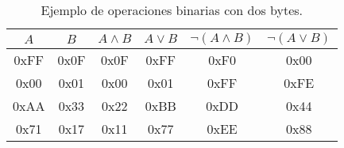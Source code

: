 \begin{table}
    \caption{Ejemplo de operaciones binarias con dos bytes.}
    \label{table:ejbyteop}
    \centering  
     \begin{tabular}{c|c|c|c|c|c}
     	\toprule
     	$A$ & $B$ & $A \land B$ & $A \lor B$ & $\neg (A \land B)$ & $\neg (A \lor B)$ \\
     	\midrule
     	0xFF & 0x0F & 0x0F & 0xFF & 0xF0 & 0x00 \\
     	0x00 & 0x01 & 0x00 & 0x01 & 0xFF & 0xFE \\
     	0xAA & 0x33 & 0x22 & 0xBB & 0xDD & 0x44 \\
     	0x71 & 0x17 & 0x11 & 0x77 & 0xEE & 0x88 \\
     	\bottomrule
     \end{tabular}
\end{table}
